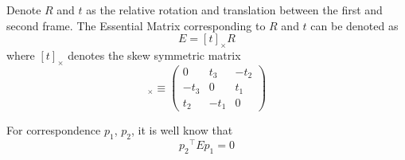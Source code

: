\documentclass{article}
\begin{document}
Denote $R$ and $t$ as the relative rotation and translation between the first and second frame. The Essential Matrix corresponding to $R$ and $t$ can be denoted as 
\begin{equation}
E = [t]_\times R
\end{equation}
where $[t]_\times$ denotes the skew symmetric matrix
\begin{equation}
[t]_\times \equiv \left(
	\begin{array}{clr}
		0 & t_3 & -t_2 \\
		-t_3 & 0 & t_1 \\
		t_2 & -t_1 & 0
	\end{array}
\right)	
\end{equation}

For correspondence $p_1$, $p_2$, it is well know that
\begin{equation}
{p_2}^\top E p_1 = 0
\end{equation}
\end{document}
